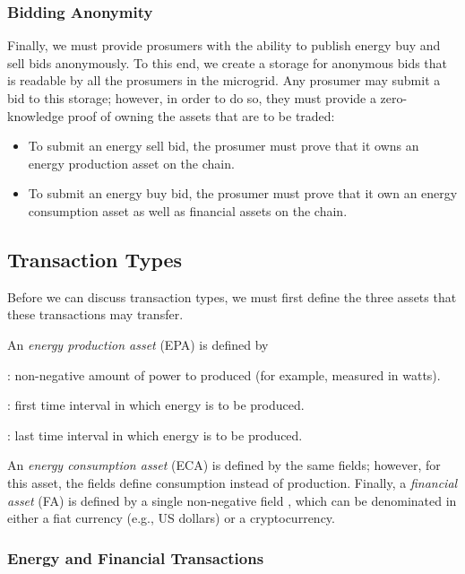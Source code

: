 \subsubsection{Bidding Anonymity}
Finally, we must provide prosumers with the ability to publish energy buy and sell bids anonymously.
To this end, we create a storage for anonymous bids that is readable by all the prosumers in the microgrid.
Any prosumer may submit a bid to this storage; however, in order to do so, they must provide a zero-knowledge proof of owning the assets that are to be traded:
\begin{itemize}
\item To submit an energy sell bid, the prosumer must prove that it owns an energy production asset on the chain.
\item To submit an energy buy bid, the prosumer must prove that it own an energy consumption asset as well as financial assets on the chain.
\end{itemize}


\subsection{Transaction Types}

Before we can discuss transaction types, we must first define the three assets that these transactions may transfer.

An \emph{energy production asset} (EPA) is defined by
\begin{compactitem}
\item {}: non-negative amount of power to produced (for example, measured in watts).
\item {}: first time interval in which energy is to be produced. 
\item {}: last time interval in which energy is to be produced.
\end{compactitem}
An \emph{energy consumption asset} (ECA) is defined by the same fields; however, for this asset, the fields define consumption instead of production.
Finally, a \emph{financial asset} (FA) is defined by a single non-negative field , which can be denominated in either a fiat currency (e.g., US dollars) or a cryptocurrency.

\subsubsection{Energy and Financial Transactions}

